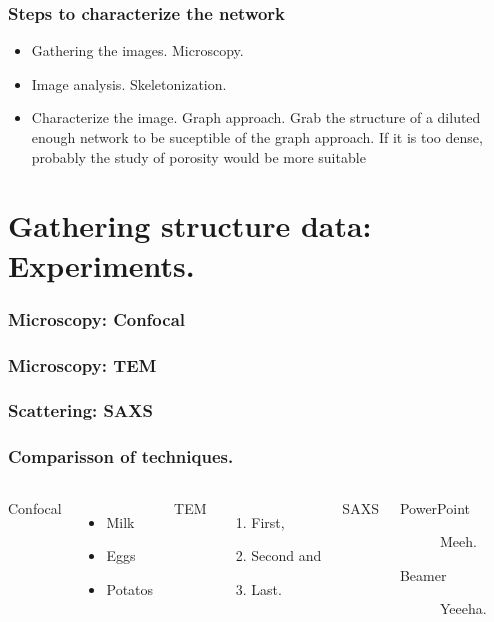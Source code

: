 \documentclass[10pt]{beamer}
\begin{document}
\begin{frame}
    \frametitle{Steps to characterize the network}
\begin{itemize}
    \item Gathering the images. Microscopy.
    \item Image analysis. Skeletonization.
    \item Characterize the image. Graph approach.
    \note
    {
        Grab the structure of a diluted enough network to be suceptible of the graph approach.
        If it is too dense, probably the study of porosity would be more suitable
    }
\end{itemize}
\end{frame}

\section{Gathering structure data: Experiments.}

\begin{frame}
    \frametitle{Microscopy: Confocal}
\end{frame}
\begin{frame}
    \frametitle{Microscopy: TEM}
\end{frame}
\begin{frame}
    \frametitle{Scattering: SAXS}
\end{frame}
\begin{frame}
  \frametitle{Comparisson of techniques.}
  \begin{columns}[T,onlytextwidth]
      Confocal
      \begin{itemize}
        \item Milk \item Eggs \item Potatos
      \end{itemize}

      TEM
      \begin{enumerate}
        \item First, \item Second and \item Last.
      \end{enumerate}

      SAXS
      \begin{description}
        \item[PowerPoint] Meeh. \item[Beamer] Yeeeha.
      \end{description}
  \end{columns}
\end{frame}
\end{document}
